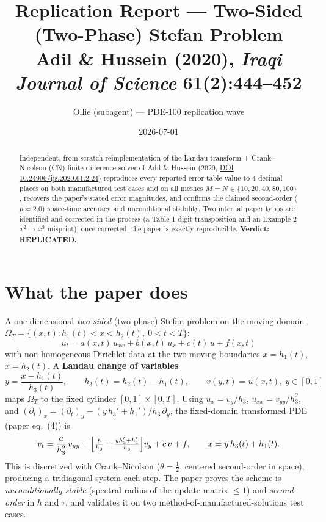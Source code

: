 \documentclass[11pt]{article}
\title{Replication Report --- Two-Sided (Two-Phase) Stefan Problem\\
\large Adil \& Hussein (2020), \textit{Iraqi Journal of Science} 61(2):444--452}
\author{Ollie (subagent) --- PDE-100 replication wave}
\date{2026-07-01}
\begin{document}
\maketitle

\begin{abstract}
Independent, from-scratch reimplementation of the Landau-transform +
Crank--Nicolson (CN) finite-difference solver of Adil \& Hussein (2020,
\href{https://doi.org/10.24996/ijs.2020.61.2.24}{DOI 10.24996/ijs.2020.61.2.24})
reproduces every reported error-table value to 4 decimal places on both
manufactured test cases and on all meshes $M=N\in\{10,20,40,80,100\}$, recovers
the paper's stated error magnitudes, and confirms the claimed second-order
($p\approx 2.0$) space-time accuracy and unconditional stability. Two internal
paper typos are identified and corrected in the process (a Table-1 digit
transposition and an Example-2 $x^{2}\!\to\!x^{3}$ misprint); once corrected,
the paper is exactly reproducible. \textbf{Verdict: REPLICATED.}
\end{abstract}

\section{What the paper does}
A one-dimensional \emph{two-sided} (two-phase) Stefan problem on the moving
domain $\Omega_T=\{(x,t): h_1(t)<x<h_2(t),\ 0<t<T\}$:
\begin{equation}
u_t = a(x,t)\,u_{xx} + b(x,t)\,u_x + c(t)\,u + f(x,t)
\label{eq:pde}
\end{equation}
with non-homogeneous Dirichlet data at the two moving boundaries $x=h_1(t)$,
$x=h_2(t)$. A \textbf{Landau change of variables}
\[
y=\frac{x-h_1(t)}{h_3(t)},\qquad h_3(t)=h_2(t)-h_1(t),\qquad v(y,t)=u(x,t),\ y\in[0,1]
\]
maps $\Omega_T$ to the fixed cylinder $[0,1]\times[0,T]$. Using
$u_x=v_y/h_3$, $u_{xx}=v_{yy}/h_3^{2}$, and
$(\partial_t)_x = (\partial_t)_y - (y\,h_3'+h_1')/h_3\,\partial_y$, the
fixed-domain transformed PDE (paper eq.~(4)) is
\begin{equation}
v_t = \frac{a}{h_3^{2}}\,v_{yy} + \Bigl[\tfrac{b}{h_3} + \tfrac{y h_3' + h_1'}{h_3}\Bigr] v_y + c\,v + f,
\qquad x = y\,h_3(t) + h_1(t).
\label{eq:transformed}
\end{equation}
This is discretized with Crank--Nicolson ($\theta=\tfrac12$, centered
second-order in space), producing a tridiagonal system each step. The paper
proves the scheme is \emph{unconditionally stable} (spectral radius of the
update matrix $\le 1$) and \emph{second-order} in $h$ and $\tau$, and validates
it on two method-of-manufactured-solutions test cases.
\end{document}
